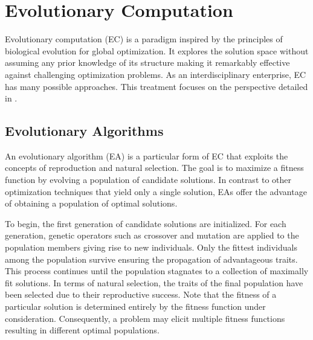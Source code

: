 \documentclass[12pt]{report}
\begin{document}
 
 
 
 
\section{Evolutionary Computation}
Evolutionary computation (EC) is a paradigm inspired by the principles of biological evolution for global optimization. It explores the solution space without assuming any prior knowledge of its structure making it remarkably effective against challenging optimization problems. As an interdisciplinary enterprise, EC has many possible approaches. This treatment focuses on the perspective detailed in \citet{ashlock2010}. 





\subsection{Evolutionary Algorithms}
An evolutionary algorithm (EA) is a particular form of EC that exploits the concepts of reproduction and natural selection. The goal is to maximize a fitness function by evolving a population of candidate solutions. In contrast to other optimization techniques that yield only a single solution, EAs offer the advantage of obtaining a population of optimal solutions. 

To begin, the first generation of candidate solutions are initialized. For each generation, genetic operators such as crossover and mutation are applied to the population members giving rise to new individuals. Only the fittest individuals among the population survive ensuring the propagation of advantageous traits. This process continues until the population stagnates to a collection of maximally fit solutions.  In terms of natural selection, the traits of the final population have been selected due to their reproductive success. Note that the fitness of a particular solution is determined entirely by the fitness function under consideration. Consequently, a problem may elicit multiple fitness functions resulting in different optimal populations. 




\end{document}
